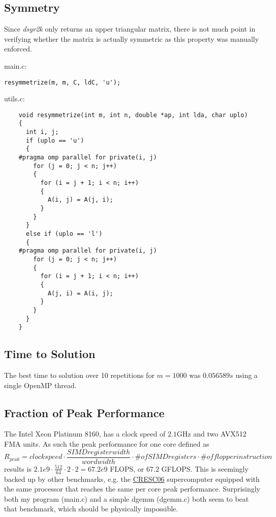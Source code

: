 \documentclass{scrartcl}
\begin{document}
\subsection{Symmetry}
Since \emph{dsyr2k} only returns an upper triangular matrix, there is not much point in verifying whether the matrix is actually symmetric as this property was manually enforced.

main.c:
\begin{verbatim}
resymmetrize(m, m, C, ldC, 'u');
\end{verbatim}

utils.c:
\begin{verbatim}
	void resymmetrize(int m, int n, double *ap, int lda, char uplo)
	{
	  int i, j;
	  if (uplo == 'u')
	  {
	#pragma omp parallel for private(i, j)
		for (j = 0; j < n; j++)
		{
		  for (i = j + 1; i < n; i++)
		  {
			A(i, j) = A(j, i);
		  }
		}
	  }
	  else if (uplo == 'l')
	  {
	#pragma omp parallel for private(i, j)
		for (j = 0; j < n; j++)
		{
		  for (i = j + 1; i < n; i++)
		  {
			A(j, i) = A(i, j);
		  }
		}
	  }
	}
\end{verbatim} 

\subsection{Time to Solution}

The best time to solution over 10 repetitions for $m=1000$ was $0.056589s$ using a single OpenMP thread.

\subsection{Fraction of Peak Performance}
The Intel Xeon Platinum 8160, has a clock speed of $2.1$GHz and two AVX512 FMA units.
As such the peak performance for one core defined as 
\begin{equation}
	R_{peak} = clock speed \cdot \frac{SIMD register width}{word width} \cdot \# of SIMD registers \cdot \# of flop per instruction
\end{equation}
results is $2.1e9 \cdot \frac{512}{64} \cdot 2 \cdot 2 = 67.2e9$ FLOPS, or $67.2$ GFLOPS.
This is seemingly backed up by other benchmarks, e.g. the \href{https://www.top500.org/system/179574/}{CRESC06} supercomputer equipped with the same processor that reaches the same per core peak performance.
Surprisingly both my program (main.c) and a simple dgemm (dgemm.c) both seem to beat that benchmark, which should be physically impossible.
\end{document}
